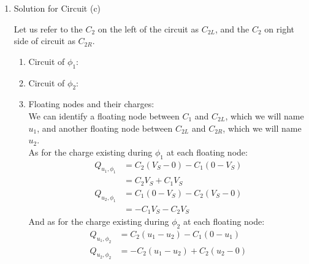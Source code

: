 {\begin{enumerate}
{\begin{enumerate}
{                }
            \end{enumerate}
        }
        \item {
            Solution for Circuit (c) \\
            \begin{center}
                
            \end{center}
            Let us refer to the $C_2$ on the left of the circuit as $C_{2L}$, and the $C_2$ on right side of circuit as $C_{2R}$.
            \begin{enumerate}
                \item[1.] {
                    Circuit of $\phi_1$:
                    \begin{center}
                        
                    \end{center}
                }
                \item[2.] {
                    Circuit of $\phi_2$:
                    \begin{center}
                        
                    \end{center}
                }
                \item[3.] {
                    Floating nodes and their charges: \\
                    We can identify a floating node between $C_1$ and $C_{2L}$, which we will name $u_1$, and another floating node between $C_{2L}$ and $C_{2R}$, which we will name $u_2$. \\
                    As for the charge existing during $\phi_1$ at each floating node:
                    \begin{align*}
                        Q_{u_1, \phi_1} &= C_2 (V_S - 0) - C_1 (0 - V_S) \\
                        &= C_2 V_S + C_1 V_S \\
                        Q_{u_2, \phi_1} &= C_1 (0 - V_S) - C_2 (V_S - 0) \\
                        &= - C_1 V_S - C_2 V_S
                    \end{align*}
                    And as for the charge existing during $\phi_2$ at each floating node:
                    \begin{align*}
                        Q_{u_1, \phi_2} &= C_2 (u_1 - u_2) - C_1 (0 - u_1) \\
                        Q_{u_2, \phi_2} &= - C_2 (u_1 - u_2) + C_2 (u_2 - 0)
                    \end{align*}
                    
}
\end{enumerate}}
\end{enumerate}}
